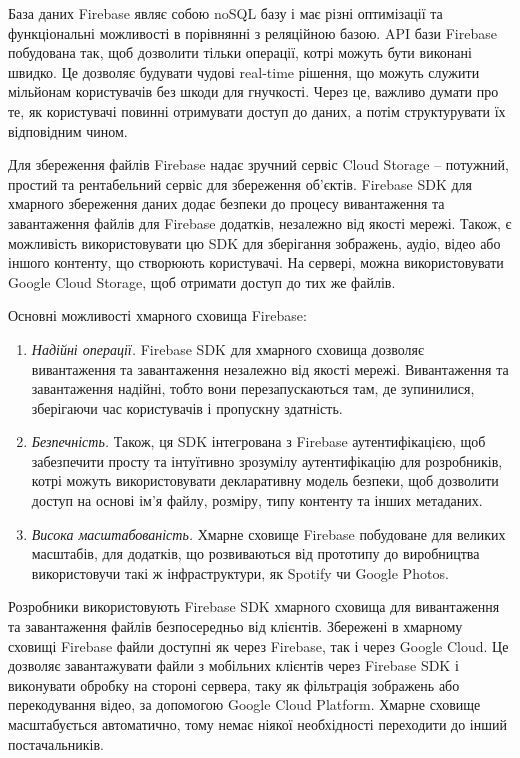 \documentclass[../main.tex]{subfiles}
\begin{document}
База даних Firebase являє собою noSQL базу і має різні оптимізації та функціональні можливості в порівнянні з реляційною базою. API бази Firebase побудована так, щоб дозволити тільки операції, котрі можуть бути виконані швидко. Це дозволяє будувати чудові real-time рішення, що можуть служити мільйонам користувачів без шкоди для гнучкості. Через це, важливо думати про те, як користувачі повинні отримувати доступ до даних, а потім структурувати їх відповідним чином.

Для збереження файлів Firebase надає зручний сервіс Cloud Storage -- потужний, простий та рентабельний сервіс для збереження об'єктів. Firebase SDK для хмарного збереження даних додає безпеки до процесу вивантаження та завантаження файлів для Firebase додатків, незалежно від якості мережі. Також, є можливість використовувати цю SDK для зберігання зображень, аудіо, відео або іншого контенту, що створюють користувачі. На сервері, можна використовувати Google Cloud Storage, щоб отримати доступ до тих же файлів.

Основні можливості хмарного сховища Firebase:
\begin{enumerate}
	\item \textit{Надійні операції.} Firebase SDK для хмарного сховища дозволяє вивантаження та завантаження незалежно від якості мережі. Вивантаження та завантаження надійні, тобто вони перезапускаються там, де зупинилися, зберігаючи час користувачів і пропускну здатність.
	\item \textit{Безпечність.} Також, ця SDK інтегрована з Firebase аутентифікацією, щоб забезпечити просту та інтуїтивно зрозумілу аутентифікацію для розробників, котрі можуть використовувати декларативну модель безпеки, щоб дозволити доступ на основі ім'я файлу, розміру, типу контенту та інших метаданих.
	\item \textit{Висока масштабованість.} Хмарне сховище Firebase побудоване для великих масштабів, для додатків, що розвиваються від прототипу до виробництва використовучи такі ж інфраструктури, як Spotify чи Google Photos.
\end{enumerate}

Розробники використовують Firebase SDK хмарного сховища для вивантаження та завантаження файлів безпосередньо від клієнтів. Збережені в хмарному сховищі Firebase файли доступні як через Firebase, так і через Google Cloud. Це дозволяє завантажувати файли з мобільних клієнтів через Firebase SDK і виконувати обробку на стороні сервера, таку як фільтрація зображень або перекодування відео, за допомогою Google Cloud Platform. Хмарне сховище масштабується автоматично, тому немає ніякої необхідності переходити до інший постачальників.
\end{document}
